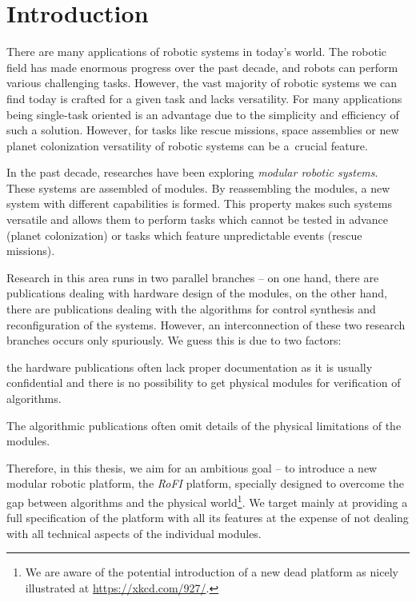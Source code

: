\chapter{Introduction}\label{chap:introduction}

There are many applications of robotic systems in today's world. The robotic
field has made enormous progress over the past decade, and robots can perform
various challenging tasks. However, the vast majority of robotic systems we can
find today is crafted for a given task and lacks versatility. For many
applications being single-task oriented is an advantage due to the simplicity
and efficiency of such a solution. However, for tasks like rescue missions,
space assemblies or new planet colonization versatility of robotic systems can
be a~crucial feature.

In the past decade, researches have been exploring \emph{modular robotic
systems}. These systems are assembled of modules. By reassembling the modules, a
new system with different capabilities is formed. This property makes such
systems versatile and allows them to perform tasks which cannot be tested in
advance (planet colonization) or tasks which feature unpredictable events
(rescue missions).

Research in this area runs in two parallel branches -- on one hand, there are
publications dealing with hardware design of the modules, on the other hand,
there are publications dealing with the algorithms for control synthesis and
reconfiguration of the systems. However, an interconnection of these two
research branches occurs only spuriously. We guess this is due to two factors:
\begin{enumerate*}
    \item the hardware publications often lack proper documentation as it is
    usually confidential and there is no possibility to get physical modules for
    verification of algorithms.
    \item The algorithmic publications often omit details of the physical
    limitations of the modules.
\end{enumerate*}

Therefore, in this thesis, we aim for an ambitious goal -- to introduce a new
modular robotic platform, the \emph{RoFI} platform, specially designed to
overcome the gap between algorithms and the physical world\footnote{We are aware
of the potential introduction of a new dead platform as nicely illustrated at
\url{https://xkcd.com/927/}.}. We target mainly at providing a full
specification of the platform with all its features at the expense of not
dealing with all technical aspects of the individual modules.

